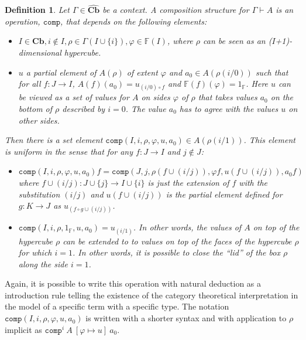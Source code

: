 \documentclass[12pt,a4paper,twoside,xetex]{book} %
\newcommand{\keyword}[1]{\emph{#1}\index{#1}}
\newtheorem{definition}[theorem]{Definition}
\newcommand{\psh}[1]{\widehat{#1}}
\newcommand{\op}[1]{\mathtt{#1}}
\newcommand{\cube}[0]{\textbf{Cb}}
\newcommand{\compt}[5]{\op{comp}^{#1} \ {#2} \ \left[{#3} \mapsto {#4} \right] \ {#5}}
\begin{document}
\begin{definition}\label{compdef}
Let $\Gamma \in \psh{\cube}$ be a context. A \keyword{composition structure} for $\Gamma \vdash A$ is an operation, 
$\op{comp}$, that depends on the following elements:

\begin{itemize}
\item $I \in \cube, i \not \in I, \rho \in \Gamma(I \cup \{i\}), \varphi 
\in \mathbb{F}(I)$, where $\rho$ can be seen as an ($I$+1)-dimensional 
hypercube.
\item $u$ a partial element of $A(\rho)$ of extent $\varphi$ and $a_0 \in 
A(\rho (i/0))$ such that for all $f:J\rightarrow I$, $A(f)(a_0) = u _{(i/0) 
\circ f}$ and $\mathbb{F}(f)(\varphi) = 1_{\mathbb{F}}$. Here $u$ can be viewed 
as a set of values for $A$ on sides $\varphi$ of $\rho$ that takes values $a_0$ 
on the bottom of $\rho$ described by $i=0$. The value $a_0$ has to agree with 
the values $u$ on other sides.
\end{itemize}

Then there is a set element $\op{comp}(I,i,\rho,\varphi, u,a_0)\in 
A(\rho(i/1))$. This element is uniform in the sense that for any $f:J 
\rightarrow I$ and $j \not \in J$: 

\begin{itemize}
\item $\op{comp} \left(I,i,\rho,\varphi, u , a_0 \right) f = 
\op{comp}(J,j,\rho(f \cup (i/j)), \varphi f, u(f \cup (i/j)), a_0 f)$  where $f 
\cup (i/j): J \cup \{j\} \rightarrow I \cup \{i\}$ is just the extension of $f$ 
with the substitution $(i/j)$ and $u(f \cup (i/j))$ is the partial element 
defined for $g: K \rightarrow J$ as $u_{(f \circ g \cup (i/j))}$.

\item $\op{comp}(I,i,\rho, 1_{\mathbb{F}}, u, a_0) = u_{(i/1)}$. In other 
words, the values of $A$ on top of the hypercube $\rho$ can be extended to to 
values on top of the faces of the hypercube $\rho$ for which $i=1$. In other 
words, it is possible to close the ``lid'' of the box $\rho$ along the side 
$i=1$.

\end{itemize}



\end{definition}



Again, it is possible to write this operation with natural deduction as a introduction rule telling the 
existence of the category theoretical interpretation in the model of a specific 
term with a specific type. The notation $\op{comp}(I,i,\rho, \varphi, u, a_0)$ 
is written with a shorter syntax and with application to $\rho$ implicit as 
$\compt{i}{A}{\varphi}{u}{a_0}$.
\end{document}
